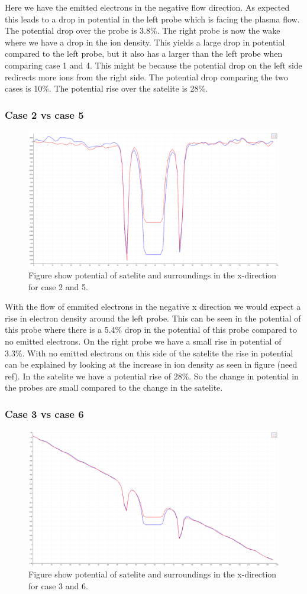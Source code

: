 Here we have the emitted electrons in the negative flow direction. As expected this
leads to a drop in potential in the left probe which is facing the plasma flow. The
potential drop over the probe is 3.8\%. The right probe is now the wake where we have
a drop in the ion density. This yields a large drop in potential compared to the left
probe, but it also has a larger than the left probe when comparing case 1 and 4. This
might be because the potential drop on the left side redirects more ions from the right side.
The potential drop comparing the two cases is 10\%. The potential rise over the satelite is 28\%.


\subsubsection{Case 2 vs case 5}

\begin{figure}
    \includegraphics[width = 0.5 \textwidth]{images/pot_case25.png}
    \caption{Figure show potential of satelite and surroundings in the x-direction for case 2 and 5.}
\end{figure}

With the flow of emmited electrons in the negative x direction we would expect a rise in electron density around the left probe.
This can be seen in the potential of this probe where there is a 5.4\% drop in the potential of this probe compared to no emitted
electrons. On the right probe we have a small rise in potential of 3.3\%. With no emitted electrons on this side of the satelite the rise in
potential can be explained by looking at the increase in ion density as seen in figure (need ref).
In the satelite we have a potential rise of 28\%. So the change in potential in the probes are small compared to the change in the satelite.

\subsubsection{Case 3 vs case 6}

\begin{figure}
    \includegraphics[width = 0.5 \textwidth]{images/pot_case36.png}
    \caption{Figure show potential of satelite and surroundings in the x-direction for case 3 and 6.}
\end{figure}


